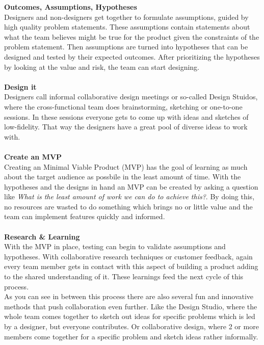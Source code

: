 
\textbf{Outcomes, Assumptions, Hypotheses} \\ %
Designers and non-designers get together to formulate assumptions, guided by high quality problem
statements. These assumptions contain statements about what the team believes might be true for the
product given the constraints of the problem statement. Then assumptions are turned into hypotheses
that can be designed and tested by their expected outcomes. After prioritizing the hypotheses by
looking at the value and risk, the team can start designing.
\\\\
\textbf{Design it} \\
Designers call informal collaborative design meetings or so-called Design Stuidos, where the
cross-functional team does brainstorming, sketching or one-to-one sessions. In these sessions
everyone gets to come up with ideas and sketches of low-fidelity. That way the designers have a
great pool of diverse ideas to work with.  \\\\ 
\textbf{Create an MVP} \\
Creating an Minimal Viable Product (MVP) has the goal of learning as much about the target audience
as possbile in the least amount of time. With the hypotheses and the designs in hand an MVP can be
created by asking a question like \textit{What is the least amount of work we can do to achieve
this?}. By doing this, no resources are wasted to do something which brings no or little value and
the team can implement features quickly and informed.
 \\\\
\textbf{Research \& Learning} \\
With the MVP in place, testing can begin to validate assumptions and hypotheses. With collaborative
research techniques or customer feedback, again every team member gets in contact with this aspect
of building a product adding to the shared understanding of it. These learnings feed the next cycle
of this process.  \\

As you can see in between this process there are also several fun and innovative methods that push
collaboration even further. Like the Design Studio, where the whole team comes together to sketch
out ideas for specific problems which is led by a designer, but everyone contributes. 
 Or collaborative design, where 2 or more
members come together for a specific problem and sketch ideas rather informally. 

